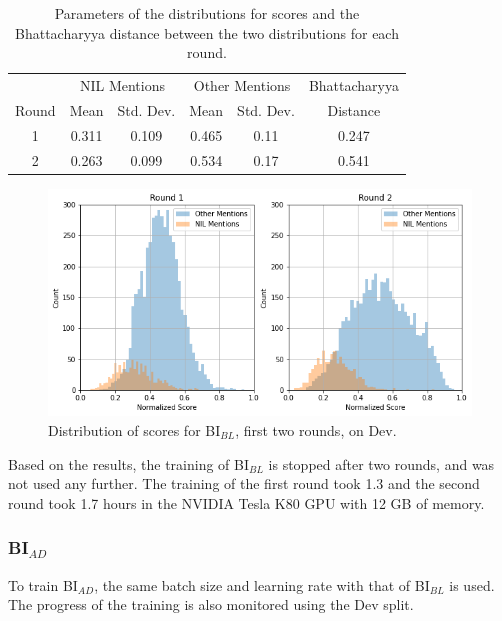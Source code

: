 \documentclass{report}
\theoremstyle{definition}
\theoremstyle{remark}
\begin{document}
\begin{table}
    \centering
    \begin{tabular}{c|cc|cc|c}
    & \multicolumn{2}{c|}{NIL Mentions} & \multicolumn{2}{c|}{Other Mentions} & Bhattacharyya\\
     Round  &  Mean & Std. Dev. &  Mean &  Std. Dev.& Distance\\
     \hline
    1     &  0.311& 0.109&0.465&0.11&0.247\\ 
    2     & 0.263&0.099 & 0.534 & 0.17&0.541\\
    \end{tabular}
    \caption{Parameters of the distributions for scores and the Bhattacharyya distance between the two distributions for each round.}
    \label{tab:nilnotnilBparams}
\end{table}

\begin{figure}
    \centering
    \includegraphics[scale=0.5]{biencoderbnil.png}
    \caption{Distribution of scores for BI$_{BL}$, first two rounds, on Dev.}
    \label{fig:biencoderbnil}
\end{figure}

Based on the results, the training of BI$_{BL}$ is stopped after two rounds, and was not used any further. The training of the first round took 1.3 and the second round took 1.7 hours in the NVIDIA Tesla K80 GPU with 12 GB of memory.
\subsubsection{BI$_{AD}$}
To train BI$_{AD}$, the same batch size and learning rate with that of BI$_{BL}$ is used. The progress of the training is also monitored using the Dev split. 
\end{document}
